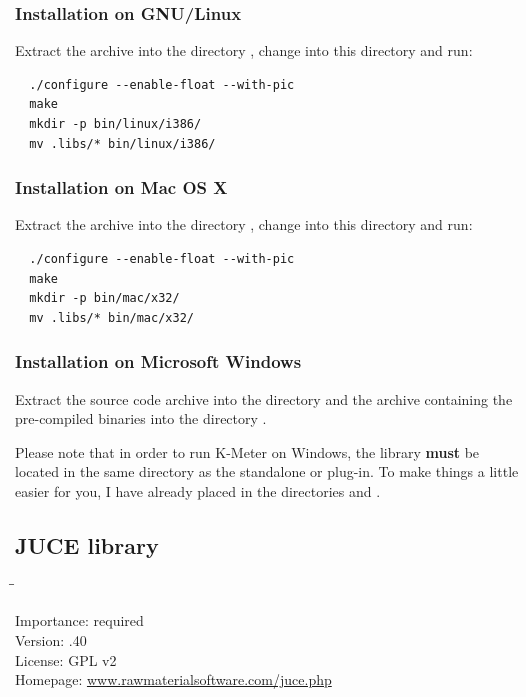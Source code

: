 \subsubsection{Installation on GNU/Linux}

Extract the archive into the directory , change
into this directory and run:

\begin{verbatim}
  ./configure --enable-float --with-pic
  make
  mkdir -p bin/linux/i386/
  mv .libs/* bin/linux/i386/
\end{verbatim}

\subsubsection{Installation on Mac OS X}

Extract the archive into the directory , change
into this directory and run:

\begin{verbatim}
  ./configure --enable-float --with-pic
  make
  mkdir -p bin/mac/x32/
  mv .libs/* bin/mac/x32/
\end{verbatim}

\subsubsection{Installation on Microsoft Windows}

Extract the source code archive into the directory
 and the archive containing the pre-compiled
binaries into the directory .

Please note that in order to run K-Meter on Windows, the library
 \textbf{must} be located in the same directory
as the standalone or plug-in.  To make things a little easier for you,
I have already placed  in the directories
 and .

\subsection{JUCE library}

\begin{tabbing}
  \hspace*{6em}\=\=\kill

  Importance:  \> required \\
  Version:     .40 \\
  License:     \> GPL v2 \\
  Homepage:    \> \href{http://www.rawmaterialsoftware.com/juce.php}{www.rawmaterialsoftware.com/juce.php}
\end{tabbing}

